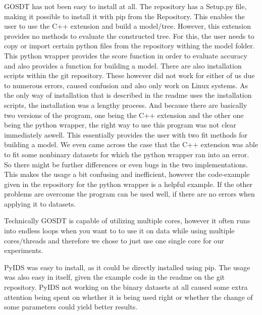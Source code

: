 \documentclass[a4paper,preprint]{sig-alternate-xt}
\begin{document}
GOSDT has not been easy to install at all. The repository has a Setup.py file, making it possible to install it with pip from the Repository. This enables the user to use the C++ extension and build a model/tree. However, this extension provides no methods to evaluate the constructed tree. For this, the user needs to copy or import certain python files from the repository withing the model folder. This python wrapper provides the score function in order to evaluate accuracy and also provides a function for building a model. There are also installation scripts within the git repository. These however did not work for either of us due to numerous errors, caused confusion and also only work on Linux systems. As the only way of installation that is described in the readme uses the installation scripts, the installation was a lengthy process. And because there are basically two versions of the program, one being the C++ extension and the other one being the python wrapper, the right way to use this program was not clear immediately aswell. This essentially provides the user with two fit methods for building a model. We even came across the case that the C++ extension was able to fit some nonbinary datasets for which the python wrapper ran into an error. So there might be further differences or even bugs in the two implementations. This makes the usage a bit confusing and inefficient, however the code-example given in the repository for the python wrapper is a helpful example. If the other problems are overcome the program can be used well, if there are no errors when applying it to datasets.

Technically GOSDT is capable of utilizing multiple cores, however it often runs into endless loops when you want to to use it on data while using multiple cores/threads and therefore we chose to just use one single core for our experiments. 

PyIDS was easy to install, as it could be directly installed using pip. The usage was also easy in itself, given the example code in the readme on the git repository. PyIDS not working on the binary datasets at all caused some extra attention being spent on whether it is being used right or whether the change of some parameters could yield better results. 
\end{document}

